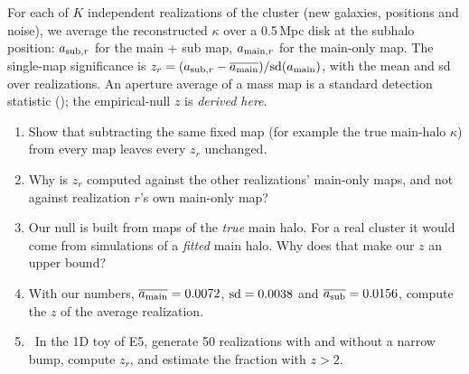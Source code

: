 \begin{given}
For each of $K$ independent realizations of the cluster (new galaxies, positions and noise), we average the
reconstructed $\kappa$ over a 0.5\,Mpc disk at the subhalo position: $a_{{\rm sub},r}$ for the main + sub map,
$a_{{\rm main},r}$ for the main-only map. The single-map significance is
$z_r = (a_{{\rm sub},r} - \overline{a_{\rm main}})/{\rm sd}(a_{\rm main})$, with the mean and sd over realizations. An
aperture average of a mass map is a standard detection statistic (\cSchneiderMap); the empirical-null $z$ is
\emph{derived here}.
\end{given}


\begin{enumerate}
  \item Show that subtracting the same fixed map (for example the true main-halo $\kappa$) from every map leaves every
    $z_r$ unchanged.
  \item Why is $z_r$ computed against the other realizations' main-only maps, and not against realization $r$'s own
    main-only map?
  \item Our null is built from maps of the \emph{true} main halo. For a real cluster it would come from simulations of
    a \emph{fitted} main halo. Why does that make our $z$ an upper bound?
  \item With our numbers, $\overline{a_{\rm main}} = 0.0072$, ${\rm sd} = 0.0038$ and $\overline{a_{\rm sub}} = 0.0156$,
    compute the $z$ of the average realization.
  \item \py\ In the 1D toy of E5, generate 50 realizations with and without a narrow bump, compute $z_r$, and estimate
    the fraction with $z > 2$.
\end{enumerate}


